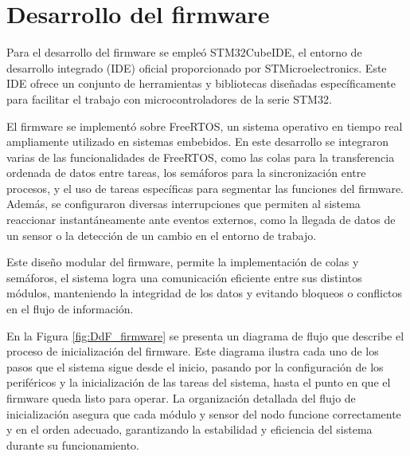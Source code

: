 \section{Desarrollo del firmware}

Para el desarrollo del firmware se empleó STM32CubeIDE, el entorno de desarrollo integrado (IDE) oficial proporcionado por STMicroelectronics. Este IDE ofrece un conjunto de herramientas y bibliotecas diseñadas específicamente para facilitar el trabajo con microcontroladores de la serie STM32. 

El firmware se implementó sobre FreeRTOS, un sistema operativo en tiempo real ampliamente utilizado en sistemas embebidos. En este desarrollo se integraron varias de las funcionalidades de FreeRTOS, como las colas para la transferencia ordenada de datos entre tareas, los semáforos para la sincronización entre procesos, y el uso de tareas específicas para segmentar las funciones del firmware. Además, se configuraron diversas interrupciones que permiten al sistema reaccionar instantáneamente ante eventos externos, como la llegada de datos de un sensor o la detección de un cambio en el entorno de trabajo.

Este diseño modular del firmware, permite la implementación de colas y semáforos, el sistema logra una comunicación eficiente entre sus distintos módulos, manteniendo la integridad de los datos y evitando bloqueos o conflictos en el flujo de información.

En la Figura \ref{fig:DdF_firmware} se presenta un diagrama de flujo que describe el proceso de inicialización del firmware. Este diagrama ilustra cada uno de los pasos que el sistema sigue desde el inicio, pasando por la configuración de los periféricos y la inicialización de las tareas del sistema, hasta el punto en que el firmware queda listo para operar. La organización detallada del flujo de inicialización asegura que cada módulo y sensor del nodo funcione correctamente y en el orden adecuado, garantizando la estabilidad y eficiencia del sistema durante su funcionamiento.


